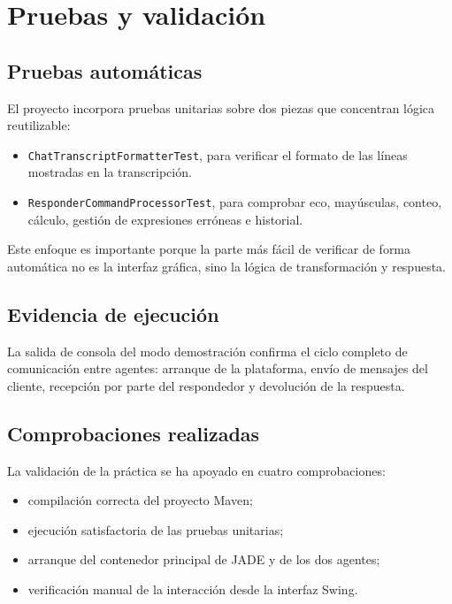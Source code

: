 \documentclass[12pt]{article}
\begin{document}
\section{Pruebas y validación}
\subsection{Pruebas automáticas}
El proyecto incorpora pruebas unitarias sobre dos piezas que concentran lógica reutilizable:

\begin{itemize}[leftmargin=*]
  \item \texttt{ChatTranscriptFormatterTest}, para verificar el formato de las líneas mostradas en la transcripción.
  \item \texttt{ResponderCommandProcessorTest}, para comprobar eco, mayúsculas, conteo, cálculo, gestión de expresiones erróneas e historial.
\end{itemize}

Este enfoque es importante porque la parte más fácil de verificar de forma automática no es la interfaz gráfica, sino la lógica de transformación y respuesta.



\subsection{Evidencia de ejecución}
La salida de consola del modo demostración confirma el ciclo completo de comunicación entre agentes: arranque de la plataforma, envío de mensajes del cliente, recepción por parte del respondedor y devolución de la respuesta.



\subsection{Comprobaciones realizadas}
La validación de la práctica se ha apoyado en cuatro comprobaciones:

\begin{itemize}[leftmargin=*]
  \item compilación correcta del proyecto Maven;
  \item ejecución satisfactoria de las pruebas unitarias;
  \item arranque del contenedor principal de JADE y de los dos agentes;
  \item verificación manual de la interacción desde la interfaz Swing.
\end{itemize}
\end{document}
